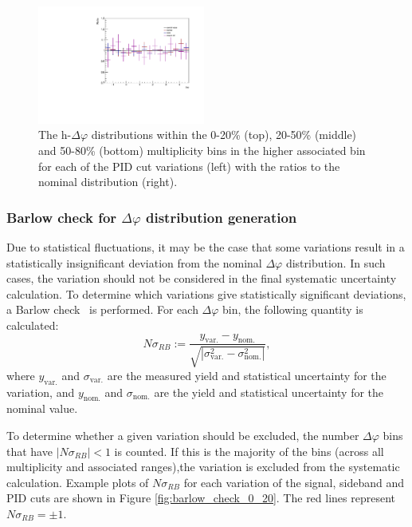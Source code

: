 \begin{figure}[ht]
    \includegraphics[width=0.49\textwidth]{figures/analysis/pid_variations_dphi_50_80_highpt_ratio.pdf}
    \caption{The h-\lmb $\Delta\varphi$ distributions within the 0-20\% (top), 20-50\% (middle) and 50-80\% (bottom) multiplicity bins in the higher associated \pt bin for each of the PID cut variations (left) with the ratios to the nominal distribution (right).}
    \label{fig:pid_cut_variations_highpt}
\end{figure}

\clearpage

\subsubsection{Barlow check for $\Delta\varphi$ distribution generation}
\label{sec:barlow_check_dphi}

Due to statistical fluctuations, it may be the case that some variations result in a statistically insignificant deviation from the nominal $\Delta\varphi$ distribution. In such cases, the variation should not be considered in the final systematic uncertainty calculation. To determine which variations give statistically significant deviations, a Barlow check~\cite{BarlowCheck} is performed. For each $\Delta\varphi$ bin, the following quantity is calculated:
%
\begin{equation}
    \label{eq:barlow_check}
	N\sigma_{RB} := \frac{y_{\text{var.}} - y_{\text{nom.}}}{\sqrt{|\sigma_{\text{var.}}^2 - \sigma_{\text{nom.}}^2|}},
\end{equation}
%
where $y_{\text{var.}}$ and $\sigma_{\text{var.}}$ are the measured yield and statistical uncertainty for the variation, and $y_{\text{nom.}}$ and $\sigma_{\text{nom.}}$ are the yield and statistical uncertainty for the nominal value. 

To determine whether a given variation should be excluded, the number $\Delta\varphi$ bins that have $|N\sigma_{RB}| < 1$ is counted. If this is the majority of the bins (across all multiplicity and associated \pt ranges),the variation is excluded from the systematic calculation. Example plots of $N\sigma_{RB}$ for each variation of the signal, sideband and PID cuts are shown in Figure \ref{fig:barlow_check_0_20}. The red lines represent $N\sigma_{RB} = \pm 1$.

